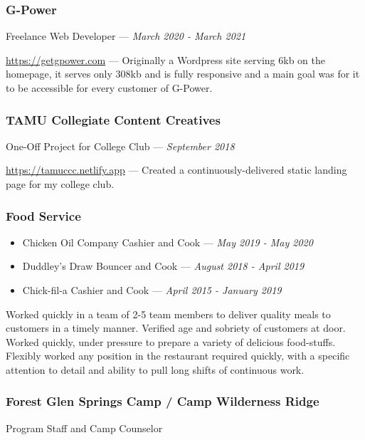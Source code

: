 \documentclass[letterpaper,10pt]{article}
\providecommand{\tightlist}
  {\setlength{\itemsep}{4pt}\setlength{\parskip}{0pt}}
\begin{document}
    \subsubsection{G-Power}
    \hfill Freelance Web Developer --- \emph{March 2020 - March 2021}

    \href{https://getgpower.com}{https://getgpower.com} --- Originally a Wordpress site serving 6kb on the homepage, it serves only 308kb and is fully responsive and a main goal was for it to be accessible for every customer of G-Power.

    \subsubsection{TAMU Collegiate Content Creatives}
    \hfill One-Off Project for College Club --- \emph{September 2018}

    \href{https://tamuccc.netlify.app}{https://tamuccc.netlify.app} --- Created a continuously-delivered static landing page for my college club.

    \subsubsection{Food Service}
    
    \begin{itemize}
        \tightlist{}
        \item
        Chicken Oil Company
        \hfill Cashier and Cook --- \emph{May 2019 - May 2020}

        \item
        Duddley's Draw
        \hfill Bouncer and Cook --- \emph{August 2018 - April 2019}

        \item
        Chick-fil-a
        \hfill Cashier and Cook --- \emph{April 2015 - January 2019}
    \end{itemize}

    Worked quickly in a team of 2-5 team members to deliver quality meals to customers in a timely manner. Verified age and sobriety of customers at door. Worked quickly, under pressure to prepare a variety of delicious food-stuffs.  Flexibly worked any position in the restaurant required quickly, with a specific attention to detail and ability to pull long shifts of continuous work.

    \subsubsection{Forest Glen Springs Camp / Camp Wilderness Ridge}
    \hfill Program Staff and Camp Counselor 
    
\end{document}
